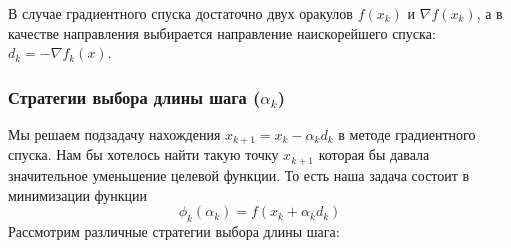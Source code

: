 В случае градиентного спуска достаточно двух оракулов
$f(x_k)$ и
$\nabla f(x_k)$,
а в качестве направления  выбирается направление наискорейшего спуска:
$d_k = -\nabla f_k(x)$.

\subsubsection{Стратегии выбора длины шага
($\alpha_k$)}

Мы решаем подзадачу нахождения
$x_{k+1} = x_k - \alpha_k d_k$  в методе градиентного спуска. Нам бы хотелось найти такую точку $x_{k+1}$ которая бы давала значительное уменьшение целевой функции.
То есть наша задача состоит в минимизации функции
\begin{equation*}
    \phi_k(\alpha_k) = f(x_k + \alpha_k d_k)
\end{equation*}
Рассмотрим различные стратегии выбора длины шага:

